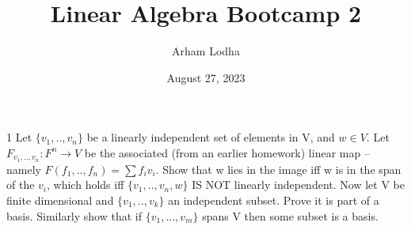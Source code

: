 \documentclass{article}
\newcommand{\rarr}[0]{\rightarrow}
\begin{document}
\title{Linear Algebra Bootcamp 2}
\author{Arham Lodha}%
\date{August 27, 2023}%
\maketitle

\begin{PROB}{1}\label{Problem 1.}
	Let $\{v_1,..,v_n\}$ be a linearly independent set of elements in V, and $w \in V$. Let $F_{v_1,..,v_n}: F^n \rarr V$ be the associated (from an earlier homework) linear map -- namely $F(f_1,..,f_n) = \sum f_i v_i$. Show that w lies in the image iff w is in the span of the $v_i$, which holds iff $\{v_1,..,v_n,w\}$ IS NOT linearly independent.  Now let V be finite dimensional and $\{v_1,..,v_k\}$ an independent subset. Prove it is part of a basis.  Similarly show that if $\{v_1,...,v_m\}$ spans V then some subset is a basis.
\end{PROB}
\end{document}
